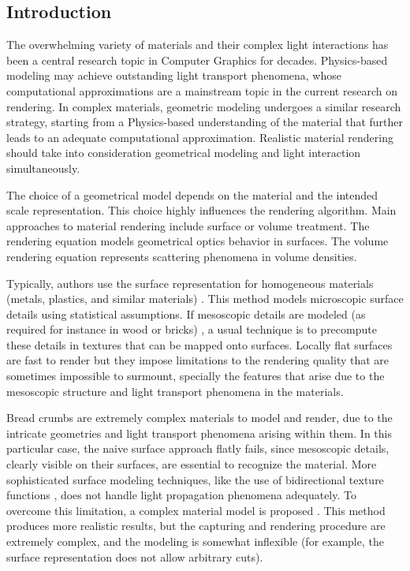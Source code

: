 \subsection{Introduction}
The overwhelming variety of materials and their complex light interactions has been a central research topic in Computer Graphics for decades. 
Physics-based modeling may achieve outstanding light transport phenomena, whose computational approximations are a mainstream topic in the current research on rendering.
In complex materials, geometric modeling undergoes a similar research strategy, starting from a Physics-based understanding of the material that further leads to an adequate computational approximation.
Realistic material rendering should take into consideration geometrical modeling and light interaction simultaneously.

The choice of a geometrical model depends on the material and the intended scale representation.
This choice highly influences the rendering algorithm. Main approaches to material rendering include surface or volume treatment. 
The rendering equation \cite{Kajiya1986} models geometrical optics behavior in surfaces. 
The volume rendering equation \cite{Kajiya1984} represents scattering phenomena in volume densities.

Typically, authors use the surface representation for homogeneous materials (metals, plastics, and similar materials) \cite{Neumann1999}.
This method models microscopic surface details using statistical assumptions.
If mesoscopic details are modeled (as required for instance in wood or bricks) \cite{Lefebvre2000}, a usual technique is to precompute these details in textures that can be mapped onto surfaces.
Locally flat surfaces are fast to render but they impose limitations to the rendering quality that are sometimes impossible to surmount, specially the features that arise due to the mesoscopic structure and light transport phenomena in the materials.

Bread crumbs are extremely complex materials to model and render, due to the intricate geometries and light transport phenomena arising within them.
In this particular case, the naive surface approach flatly fails, since mesoscopic details, clearly visible on their surfaces, are essential to recognize the material.
More sophisticated surface modeling techniques, like the use of bidirectional texture functions \cite{Tong2002}, does not handle light propagation phenomena adequately.
To overcome this limitation, a complex material model is proposed \cite{Tong2005}.
This method produces more realistic results, but the capturing and rendering procedure are extremely complex, and the modeling is somewhat inflexible (for example, the surface representation does not allow arbitrary cuts).

